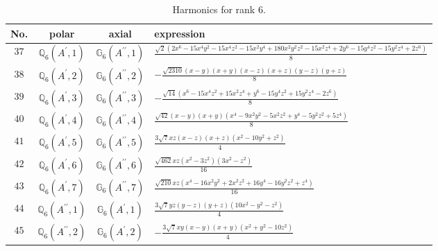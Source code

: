 \documentclass[fleqn,8pt,landscape]{jsarticle}
\begin{document}
\begin{table}[ht!]
\begin{center}
\caption{Harmonics for rank 6.}
\renewcommand{\arraystretch}{1.3}
\begin{tabular}{cccl} \hline \hline
No. & polar & axial & expression \\ \hline
$ 37 $ & $ \mathbb{Q}_{6}(A^{\prime},1) $ & $ \mathbb{G}_{6}(A^{\prime\prime},1) $ & $ \frac{\sqrt{2} \left(2 x^{6} - 15 x^{4} y^{2} - 15 x^{4} z^{2} - 15 x^{2} y^{4} + 180 x^{2} y^{2} z^{2} - 15 x^{2} z^{4} + 2 y^{6} - 15 y^{4} z^{2} - 15 y^{2} z^{4} + 2 z^{6}\right)}{8} $ \\
$ 38 $ & $ \mathbb{Q}_{6}(A^{\prime},2) $ & $ \mathbb{G}_{6}(A^{\prime\prime},2) $ & $ - \frac{\sqrt{2310} \left(x - y\right) \left(x + y\right) \left(x - z\right) \left(x + z\right) \left(y - z\right) \left(y + z\right)}{8} $ \\
$ 39 $ & $ \mathbb{Q}_{6}(A^{\prime},3) $ & $ \mathbb{G}_{6}(A^{\prime\prime},3) $ & $ - \frac{\sqrt{14} \left(x^{6} - 15 x^{4} z^{2} + 15 x^{2} z^{4} + y^{6} - 15 y^{4} z^{2} + 15 y^{2} z^{4} - 2 z^{6}\right)}{8} $ \\
$ 40 $ & $ \mathbb{Q}_{6}(A^{\prime},4) $ & $ \mathbb{G}_{6}(A^{\prime\prime},4) $ & $ \frac{\sqrt{42} \left(x - y\right) \left(x + y\right) \left(x^{4} - 9 x^{2} y^{2} - 5 x^{2} z^{2} + y^{4} - 5 y^{2} z^{2} + 5 z^{4}\right)}{8} $ \\
$ 41 $ & $ \mathbb{Q}_{6}(A^{\prime},5) $ & $ \mathbb{G}_{6}(A^{\prime\prime},5) $ & $ \frac{3 \sqrt{7} x z \left(x - z\right) \left(x + z\right) \left(x^{2} - 10 y^{2} + z^{2}\right)}{4} $ \\
$ 42 $ & $ \mathbb{Q}_{6}(A^{\prime},6) $ & $ \mathbb{G}_{6}(A^{\prime\prime},6) $ & $ \frac{\sqrt{462} x z \left(x^{2} - 3 z^{2}\right) \left(3 x^{2} - z^{2}\right)}{16} $ \\
$ 43 $ & $ \mathbb{Q}_{6}(A^{\prime},7) $ & $ \mathbb{G}_{6}(A^{\prime\prime},7) $ & $ \frac{\sqrt{210} x z \left(x^{4} - 16 x^{2} y^{2} + 2 x^{2} z^{2} + 16 y^{4} - 16 y^{2} z^{2} + z^{4}\right)}{16} $ \\
$ 44 $ & $ \mathbb{Q}_{6}(A^{\prime\prime},1) $ & $ \mathbb{G}_{6}(A^{\prime},1) $ & $ \frac{3 \sqrt{7} y z \left(y - z\right) \left(y + z\right) \left(10 x^{2} - y^{2} - z^{2}\right)}{4} $ \\
$ 45 $ & $ \mathbb{Q}_{6}(A^{\prime\prime},2) $ & $ \mathbb{G}_{6}(A^{\prime},2) $ & $ - \frac{3 \sqrt{7} x y \left(x - y\right) \left(x + y\right) \left(x^{2} + y^{2} - 10 z^{2}\right)}{4} $ \\

\end{tabular}
\end{center}
\end{table}
\end{document}
